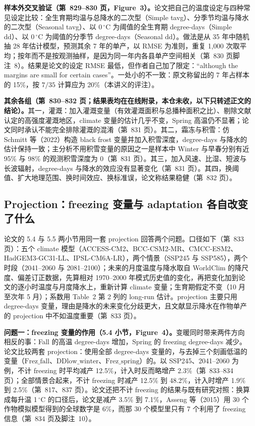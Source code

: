 \textbf{样本外交叉验证（第~829--830 页，Figure~3）。}论文把自己的温度设定与四种常见设定比较：全生育期均温与总降水的二次型（Simple tavg）、分季节均温与降水的二次型（Seasonal tavg）、以 0\,$^\circ$C 为阈值的全生育期 degree-days（Simple dd）、以 0\,$^\circ$C 为阈值的分季节 degree-days（Seasonal dd）。做法是从 35 年中随机抽 28 年估计模型，预测其余 7 年的单产，以 RMSE 为准则，重复 1{,}000 次取平均；按年而不是按观测抽样，是因为同一年内各县单产空间相关（第~830 页脚注~8）。结果是论文的设定 RMSE 最低，但作者自己加了限定：``although the margins are small for certain cases''\citep[第~830 页]{da2024climate}。一处小的不一致：原文称留出的 7 年占样本的 15\%，按 $7/35$ 计算应为 20\%（本讲义的评注）。

\textbf{其余各组（第~830--832 页；结果表均在在线附录，本仓未收，以下只转述正文的结论）。}其一，灌溉：加入灌溉变量（有效灌溉面积与总播种面积之比）、剔除文献认定的高强度灌溉地区，climate 变量的估计几乎不变，Spring 高温仍不显著；论文同时承认不能完全排除灌溉的混淆（第~831 页）。其二，霜冻与积雪：仿 Schmitt 等（2022）构造 black frost 变量并加入积雪深度，degree-days 与降水的估计保持一致；主分析不用积雪变量的原因之一是样本中 Winter 与早春分别有近 95\% 与 98\% 的观测积雪深度为 0（第~831 页）。其三，加入风速、比湿、短波与长波辐射，degree-days 与降水的效应没有显著变化（第~831 页）。其四，换阈值、扩大地理范围、换时间效应、换标准误，论文称结果稳健（第~832 页）。

\subsection{Projection：freezing 变量与 adaptation 各自改变了什么}

论文的 5.4 与 5.5 两小节用同一套 projection 回答两个问题。口径如下（第~833 页）：五个 climate 模型（ACCESS-CM2、BCC-CSM2-MR、CMCC-ESM2、HadGEM3-GC31-LL、IPSL-CM6A-LR），两个情景（SSP245 与 SSP585），两个时段（2041--2060 与 2081--2100）；未来的月度温度与降水取自 WorldClim 的降尺度、偏差订正数据，先算相对 1970--2000 年模式历史值的变化，再把变化加到论文的逐小时温度与月度降水上，重新计算 climate 变量；生育期假定不变（10 月至次年 5 月）；系数用 Table~2 第 2 列的 long-run 估计。projection 主要只用 degree-days 变量，理由是降水的未来变化分歧更大，且文献显示降水在作物单产的 projection 中不如温度重要（第~833 页）。

\textbf{问题一：freezing 变量的作用（5.4 小节，Figure~4）。}变暖同时带来两件方向相反的事：Fall 的高温 degree-days 增加，Spring 的 freezing degree-days 减少。论文比较两套 projection：使用全部 degree-days 变量的，与去掉三个刻画低温的变量（$\mathrm{Frez\_fall}$、$\mathrm{DDlow\_winter}$、$\mathrm{Frez\_spring}$）的。以 SSP245、2041--2060 为例，不计 freezing 时平均减产 12.5\%，计入时反而略增产 2.3\%（第~833--834 页）；全部情景合起来，不计 freezing 时减产 12.5\% 到 48.2\%，计入时增产 1.9\% 到 2.5\%（第~817、837 页）。论文还把不计 freezing 的结果与既有研究对照：换算成每升温 1\,$^\circ$C 的口径后，论文是减产 3.5\% 到 7.1\%，Asseng 等（2015）用 30 个作物模拟模型得到的全球数字是 6\%，而那 30 个模型里只有 7 个利用了 freezing 信息（第~834 页及脚注~10）。

